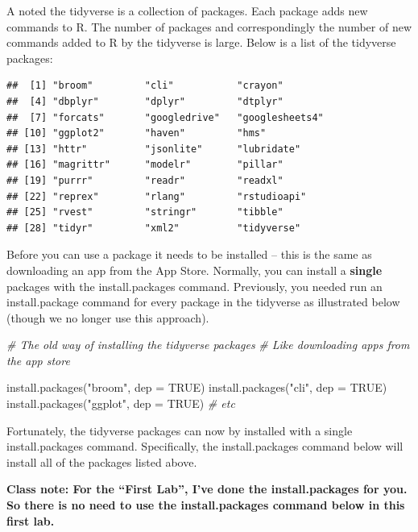 \documentclass[
]{krantz}
\makeatletter
\newenvironment{Shaded}{\begin{snugshade}}{\end{snugshade}}
\newcommand{\AttributeTok}[1]{\textcolor[rgb]{0.61,0.61,0.61}{#1}}
\newcommand{\CommentTok}[1]{\textcolor[rgb]{0.37,0.37,0.37}{\textit{#1}}}
\newcommand{\ConstantTok}[1]{\textcolor[rgb]{0,0,0}{#1}}
\newcommand{\FunctionTok}[1]{\textcolor[rgb]{0,0,0}{#1}}
\newcommand{\NormalTok}[1]{#1}
\newcommand{\StringTok}[1]{\textcolor[rgb]{0.5,0.5,0.5}{#1}}
\newenvironment{kframe}{%
\medskip{}
\setlength{\fboxsep}{.8em}
 \def\at@end@of@kframe{}%
 \ifinner\ifhmode%
  \def\at@end@of@kframe{\end{minipage}}%
  \begin{minipage}{\columnwidth}%
 \fi\fi%
 \def\FrameCommand##1{\hskip\@totalleftmargin \hskip-\fboxsep
 \colorbox{shadecolor}{##1}\hskip-\fboxsep
     \hskip-\linewidth \hskip-\@totalleftmargin \hskip\columnwidth}%
 \MakeFramed {\advance\hsize-\width
   \@totalleftmargin\z@ \linewidth\hsize
   \@setminipage}}%
 {\par\unskip\endMakeFramed%
 \at@end@of@kframe}
\renewenvironment{Shaded}{\begin{kframe}}{\end{kframe}}
\makeatother
\begin{document}
A noted the tidyverse is a collection of packages. Each package adds new commands to R. The number of packages and correspondingly the number of new commands added to R by the tidyverse is large. Below is a list of the tidyverse packages:

\begin{verbatim}
##  [1] "broom"         "cli"           "crayon"       
##  [4] "dbplyr"        "dplyr"         "dtplyr"       
##  [7] "forcats"       "googledrive"   "googlesheets4"
## [10] "ggplot2"       "haven"         "hms"          
## [13] "httr"          "jsonlite"      "lubridate"    
## [16] "magrittr"      "modelr"        "pillar"       
## [19] "purrr"         "readr"         "readxl"       
## [22] "reprex"        "rlang"         "rstudioapi"   
## [25] "rvest"         "stringr"       "tibble"       
## [28] "tidyr"         "xml2"          "tidyverse"
\end{verbatim}

Before you can use a package it needs to be installed -- this is the same as downloading an app from the App Store. Normally, you can install a \textbf{single} packages with the install.packages command. Previously, you needed run an install.package command for every package in the tidyverse as illustrated below (though we no longer use this approach).

\begin{Shaded}
\begin{Highlighting}[]
\CommentTok{\# The old way of installing the tidyverse packages}
\CommentTok{\# Like downloading apps from the app store}

\FunctionTok{install.packages}\NormalTok{(}\StringTok{"broom"}\NormalTok{, }\AttributeTok{dep =} \ConstantTok{TRUE}\NormalTok{)}
\FunctionTok{install.packages}\NormalTok{(}\StringTok{"cli"}\NormalTok{, }\AttributeTok{dep =} \ConstantTok{TRUE}\NormalTok{)}
\FunctionTok{install.packages}\NormalTok{(}\StringTok{"ggplot"}\NormalTok{, }\AttributeTok{dep =} \ConstantTok{TRUE}\NormalTok{)}
\CommentTok{\# etc}
\end{Highlighting}
\end{Shaded}

Fortunately, the tidyverse packages can now by installed with a single install.packages command. Specifically, the install.packages command below will install all of the packages listed above.

\textbf{Class note: For the ``First Lab'', I've done the install.packages for you. So there is no need to use the install.packages command below in this first lab.}
\end{document}
